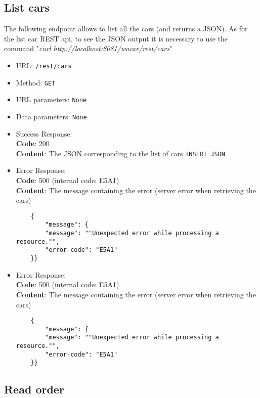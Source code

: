 \subsection*{List cars}

The following endpoint allows to list all the cars (and returns a JSON). As for the list car REST api, to see the JSON output it is necessary to use the command "\textit{curl http://localhost:8081/wacar/rest/cars}"

\begin{itemize}
    \item URL: \texttt{/rest/cars}
    \item Method: \texttt{GET}
    \item URL parameters: \texttt{None}
    \item Data parameters: \texttt{None}
    \item Success Response: \\
    \textbf{Code}: 200\\
    \textbf{Content}: The JSON corresponding to the list of cars
    \texttt{INSERT JSON}
    \item Error Response:\\
    \textbf{Code}: 500 (internal code: E5A1)\\
    \textbf{Content}: The message containing the error (server error when retrieving the cars)\\
    \begin{verbatim}
    {
        "message": {
        "message": ""Unexpected error while processing a resource."",
        "error-code": "E5A1"
    }}
    \end{verbatim}
    \item Error Response:\\
    \textbf{Code}: 500 (internal code: E5A1)\\
    \textbf{Content}: The message containing the error (server error when retrieving the cars)\\
    \begin{verbatim}
    {
        "message": {
        "message": ""Unexpected error while processing a resource."",
        "error-code": "E5A1"
    }}
    \end{verbatim}

\end{itemize}

\subsection*{Read order}

